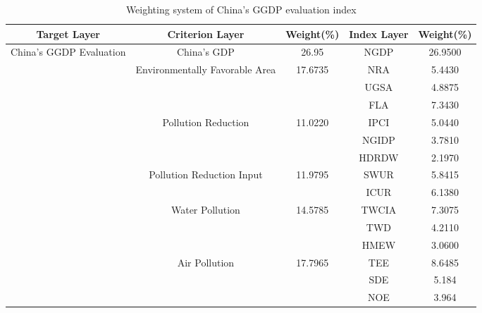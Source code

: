 \documentclass[12pt]{article}
\begin{document}
	\begin{table}[!htbp]
		\begin{center}
			\caption{ Weighting system of China's GGDP evaluation index}
			\label{tb:system}
			\begin{tabular}{ccccc}
				\toprule
				\multicolumn{1}{m{3cm}}{\centering \small \textbf{Target Layer}}
				& \multicolumn{1}{m{3cm}}{\centering \small \textbf{Criterion Layer}}
				& \multicolumn{1}{m{3cm}}{\centering \small \textbf{Weight}(\%)}
				& \multicolumn{1}{m{3cm}}{\centering \small \textbf{Index Layer}}
				& \multicolumn{1}{m{3cm}}{\centering \small \textbf{Weight}(\%)}\\
				\midrule
				\multirow{15}{2cm}{\centering \small China's GGDP Evaluation} & \multirow{1}{3cm}{\centering \small China's GDP} & 26.95 & \small NGDP & 26.9500 \\ \cline{2-5}
				& \multirow{3}{3cm}{\centering \small Environmentally Favorable Area} & \multirow{3}{*}{17.6735} & \small NRA & 5.4430 \\
				&                                                 &                   & \small UGSA  & 4.8875 \\
				&                                                 &                   & \small FLA   & 7.3430 \\ \cline{2-5} 
				& \multirow{3}{3cm}{\centering \small Pollution Reduction}            & \multirow{3}{*}{11.0220} & \small IPCI  & 5.0440 \\
				&                                                 &                   & \small NGIDP & 3.7810 \\
				&                                                 &                   & \small HDRDW & 2.1970 \\ \cline{2-5} 
				& \multirow{2}{3cm}{\centering \small Pollution Reduction Input}      & \multirow{2}{*}{11.9795} & \small SWUR  & 5.8415 \\
				&                                                 &                   & \small ICUR & 6.1380 \\ \cline{2-5} 
				& \multirow{3}{3cm}{\centering \small Water Pollution}                & \multirow{3}{*}{14.5785} & \small TWCIA & 7.3075 \\
				&                                                 &                   & \small TWD & 4.2110\\
				&                                                 &                   & \small HMEW & 3.0600\\ \cline{2-5} 
				& \multirow{3}{3cm}{\centering \small Air Pollution}                  & \multirow{3}{*}{17.7965} & \small TEE  & 8.6485 \\
				&                                                 &                   & \small SDE & 5.184 \\
				&                                                 &                   & \small NOE & 3.964\\ 
				\bottomrule
			\end{tabular}
		\end{center}
	\end{table}
	
\end{document}
